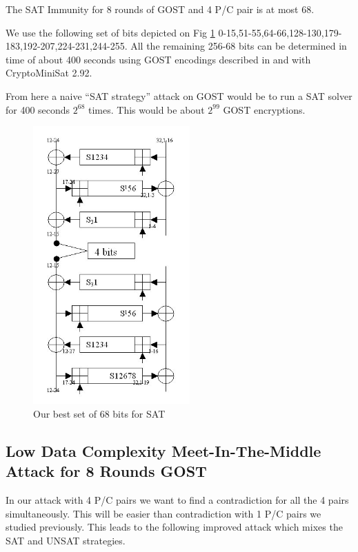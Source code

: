 \begin{lemma}
The SAT Immunity for 8 rounds of GOST and 4 P/C pair is at most 68.
\end{lemma}
	
We use the following set of bits
depicted on Fig \ref{Gost81optimal4KPSAT68Bits}
0-15,51-55,64-66,128-130,179-183,192-207,224-231,244-255.
All the remaining 256-68 bits can be determined in time of
about 400 seconds
using GOST encodings described in \cite{OptimiPaper}
and with CryptoMiniSat 2.92.

From here a naive ``SAT strategy'' attack on GOST would be to run
a SAT solver for 400 seconds $2^{68}$ times.
This would be about $2^{99}$ GOST encryptions.


\begin{figure}[h!]
	\centering
	\includegraphics[width=60mm]{./pics/gost81optimalSAT4KP.jpg}
	\caption{Our best set of 68 bits for SAT}
	\label{Gost81optimal4KPSAT68Bits}
\end{figure}


\subsection{Low Data Complexity Meet-In-The-Middle Attack for 8 Rounds GOST}
\label{section:Fact8R4KP_94_SATMethod}
In our attack with 4 P/C pairs we want to find a contradiction for all the 4 pairs simultaneously.
This will be easier than contradiction with 1 P/C pairs we studied previously.
This leads to the following improved attack which mixes the SAT and UNSAT strategies.

